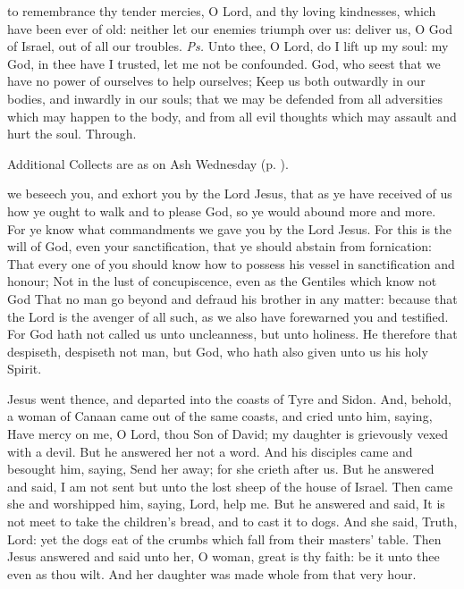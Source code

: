 \introit
{} to remembrance thy tender mercies, O Lord, and thy loving kindnesses, which have been ever of old: neither let our enemies triumph over us: deliver us, O God of Israel, out of all our troubles. \textit{Ps.} Unto thee, O Lord, do I lift up my soul: my God, in thee have I trusted, let me not be confounded.
\collect
{} God, who seest that we have no power of ourselves to help ourselves; Keep us both outwardly in our bodies, and inwardly in our souls; that we may be defended from all adversities which may happen to the body, and from all evil thoughts which may assault and hurt the soul. Through.
\begin{rubric}
    Additional Collects are as on Ash Wednesday (p. \pageref{AshWednesdayMass}).
\end{rubric}
 we beseech you, and exhort you by the Lord Jesus, that as ye have received of us how ye ought to walk and to please God, so ye would abound more and more. For ye know what commandments we gave you by the Lord Jesus. For this is the will of God, even your sanctification, that ye should abstain from fornication: That every one of you should know how to possess his vessel in sanctification and honour; Not in the lust of concupiscence, even as the Gentiles which know not God That no man go beyond and defraud his brother in any matter: because that the Lord is the avenger of all such, as we also have forewarned you and testified. For God hath not called us unto uncleanness, but unto holiness. He therefore that despiseth, despiseth not man, but God, who hath also given unto us his holy Spirit.


 Jesus went thence, and departed into the coasts of Tyre and Sidon. And, behold, a woman of Canaan came out of the same coasts, and cried unto him, saying, Have mercy on me, O Lord, thou Son of David; my daughter is grievously vexed with a devil. But he answered her not a word. And his disciples came and besought him, saying, Send her away; for she crieth after us. But he answered and said, I am not sent but unto the lost sheep of the house of Israel. Then came she and worshipped him, saying, Lord, help me. But he answered and said, It is not meet to take the children's bread, and to cast it to dogs. And she said, Truth, Lord: yet the dogs eat of the crumbs which fall from their masters' table. Then Jesus answered and said unto her, O woman, great is thy faith: be it unto thee even as thou wilt. And her daughter was made whole from that very hour.

